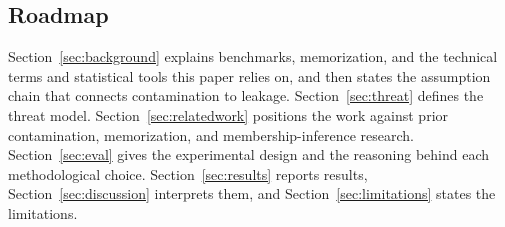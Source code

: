 \subsection{Roadmap}
Section~\ref{sec:background} explains benchmarks, memorization, and the technical terms
and statistical tools this paper relies on, and then states the assumption chain that
connects contamination to leakage. Section~\ref{sec:threat} defines the threat model.
Section~\ref{sec:relatedwork} positions the work against prior contamination,
memorization, and membership-inference research. Section~\ref{sec:eval} gives the
experimental design and the reasoning behind each methodological choice.
Section~\ref{sec:results} reports results, Section~\ref{sec:discussion} interprets them,
and Section~\ref{sec:limitations} states the limitations.
